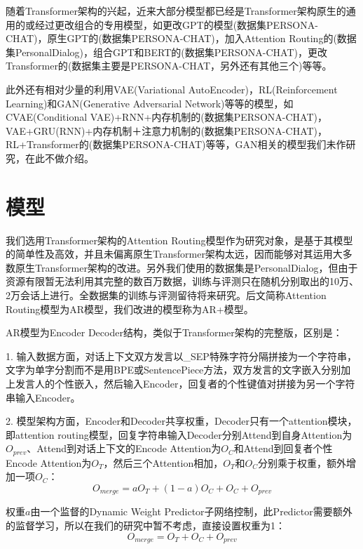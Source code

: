 \documentclass[letterpaper]{article} %
\DeclareRobustCommand{\citeext}[1]{\cite[#1]{#1}}
\begin{document}
\begin{CJK*}{UTF8}{gbsn}
随着Transformer架构的兴起，近来大部分模型都已经是Transformer架构原生的通用的或经过更改组合的专用模型，如更改GPT\citeext{Radford2018}的模型\citeext{Tselousov2018}(数据集PERSONA-CHAT)，原生GPT的\citeext{Wolf2019}(数据集PERSONA-CHAT)，加入Attention Routing的\citeext{Zheng2019}(数据集PersonalDialog)，组合GPT和BERT的\citeext{Liu2020}(数据集PERSONA-CHAT)，更改Transformer的\citeext{Roller2020}(数据集主要是PERSONA-CHAT，另外还有其他三个)等等。

此外还有相对少量的利用VAE(Variational AutoEncoder)，RL(Reinforcement Learning)和GAN(Generative Adversarial Network)等等的模型，如CVAE(Conditional VAE)+RNN+内存机制的\citeext{Song2019}(数据集PERSONA-CHAT)，VAE+GRU(RNN)+内存机制＋注意力机制的\citeext{Xu2020}(数据集PERSONA-CHAT)，RL+Transformer的\citeext{Liu2020}(数据集PERSONA-CHAT)等等，GAN相关的模型我们未作研究，在此不做介绍。

\section[Model]{模型} 

我们选用Transformer架构的Attention Routing模型\citeext{Zheng2019}作为研究对象，是基于其模型的简单性及高效，并且未偏离原生Transformer架构太远，因而能够对其运用大多数原生Transformer架构的改进。另外我们使用的数据集是PersonalDialog，但由于资源有限暂无法利用其完整的数百万数据，训练与评测只在随机分别取出的10万、2万会话上进行。全数据集的训练与评测留待将来研究。后文简称Attention Routing模型为AR模型，我们改进的模型称为AR+模型。

AR模型为Encoder Decoder结构，类似于Transformer架构的完整版\citeext{Vaswani2017}，区别是：

1. 输入数据方面，对话上下文双方发言以\_SEP特殊字符分隔拼接为一个字符串，文字为单字分割而不是用BPE或SentencePiece方法，双方发言的文字嵌入分别加上发言人的个性嵌入，然后输入Encoder，回复者的个性键值对拼接为另一个字符串输入Encoder。

2. 模型架构方面，Encoder和Decoder共享权重，Decoder只有一个attention模块，即attention routing模型，回复字符串输入Decoder分别Attend到自身Attention为\\$O_{prev}$、Attend到对话上下文的Encode Attention为$O_C$和Attend到回复者个性Encode Attention为$O_T$，然后三个Attention相加，$O_T$和$O_C$分别乘于权重，额外增加一项$O_C$：
\begin{equation}
O_{merge} = aO_T + (1 - a)O_C + O_C + O_{prev}    
\end{equation}

权重$a$由一个监督的Dynamic Weight Predictor子网络控制，此Predictor需要额外的监督学习，所以在我们的研究中暂不考虑，直接设置权重为1：
\begin{equation}
O_{merge} = O_T + O_C + O_{prev}    
\end{equation}


\end{CJK*}
\end{document}
